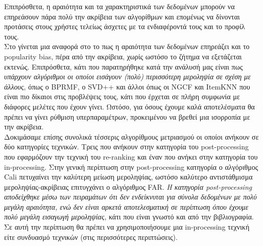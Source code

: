 Επιπρόσθετα, η αραιότητα και τα χαρακτηριστικά των δεδομένων μπορούν να επηρεάσουν πάρα πολύ την ακρίβεια των αλγορίθμων και επομένως να δίνονται προτάσεις στους χρήστες τελείως άσχετες με τα ενδιαφέροντά τους και το προφίλ τους.\\
Στο \cite{abdollahpouriManagingPopularityBias2019a} γίνεται μια αναφορά στο το πως η αραιότητα των δεδομένων επηρεάζει και το popularity bias, πέρα από την ακρίβεια, χωρίς ωστόσο το ζήτημα να εξετάζεται εκτενώς.
Επιπρόσθετα, κάτι που παρατηρήθηκε κατά την ανάλυσή μας είναι πως \textit{υπάρχουν αλγόριθμοι οι οποίοι εισάγουν (πολύ) περισσότερη μεροληψία σε σχέση με άλλους}, όπως ο BPRMF, ο SVD++ και άλλοι όπως οι NGCF και ItemKNN που είναι πιο δίκαιοι στις προβλέψεις τους, κάτι που έρχεται σε πλήρη συμφωνία με διάφορες μελέτες που έχουν γίνει. Ωστόσο, για όσους έχουμε καλά αποτελέσματα θα πρέπει να γίνει ρύθμιση υπερπαραμέτρων, προκειμένου να βρεθεί μια ισορροπία με την ακρίβεια.\\
Δοκιμάσαμε επίσης συνολικά τέσσερις αλγορίθμους μετριασμού οι οποίοι ανήκουν σε δύο κατηγορίες τεχνικών. Τρεις που ανήκουν στην κατηγορία του post-processing που εφαρμόζουν την τεχνική του re-ranking και έναν που ανήκει στην κατηγορία του in-processing. Στην γενική περίπτωση στην post-processing κατηγορία ο αλγόριθμος Cali πετυχαίνει την καλύτερη μείωση μεροληψίας, ωστόσο καλύτερο αντιστάθμισμα μεροληψίας-ακρίβειας επιτυγχάνει ο αλγόριθμος FAR. \textit{Η κατηγορία post-processing αποδείχθηκε μέσω των πειραμάτων ότι δεν ενδείκνυται για σύνολα δεδομένων με πολύ μεγάλη αραιότητα, ενώ δεν είναι αρκετά αποτελεσματική σε περίπτωση όπου έχουμε πολύ μεγάλη εισαγωγή μεροληψίας}, κάτι που είναι γνωστό και από την βιβλιογραφία. Σε αυτή την περίπτωση θα πρέπει να χρησιμοποιήσουμε μια in-processing τεχνική είτε συνδυασμό τεχνικών (στις περισσότερες περιπτώσεις).\\

